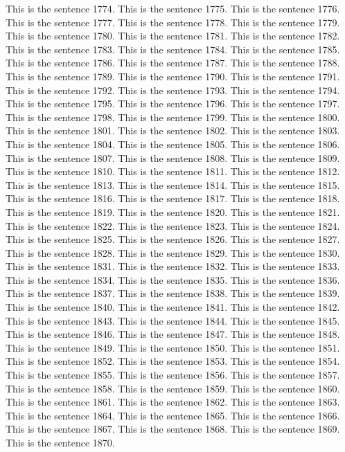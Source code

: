 \documentclass{article}
\begin{document}
This is the sentence 1774.
This is the sentence 1775.
This is the sentence 1776.
This is the sentence 1777.
This is the sentence 1778.
This is the sentence 1779.
This is the sentence 1780.
This is the sentence 1781.
This is the sentence 1782.
This is the sentence 1783.
This is the sentence 1784.
This is the sentence 1785.
This is the sentence 1786.
This is the sentence 1787.
This is the sentence 1788.
This is the sentence 1789.
This is the sentence 1790.
This is the sentence 1791.
This is the sentence 1792.
This is the sentence 1793.
This is the sentence 1794.
This is the sentence 1795.
This is the sentence 1796.
This is the sentence 1797.
This is the sentence 1798.
This is the sentence 1799.
This is the sentence 1800.
This is the sentence 1801.
This is the sentence 1802.
This is the sentence 1803.
This is the sentence 1804.
This is the sentence 1805.
This is the sentence 1806.
This is the sentence 1807.
This is the sentence 1808.
This is the sentence 1809.
This is the sentence 1810.
This is the sentence 1811.
This is the sentence 1812.
This is the sentence 1813.
This is the sentence 1814.
This is the sentence 1815.
This is the sentence 1816.
This is the sentence 1817.
This is the sentence 1818.
This is the sentence 1819.
This is the sentence 1820.
This is the sentence 1821.
This is the sentence 1822.
This is the sentence 1823.
This is the sentence 1824.
This is the sentence 1825.
This is the sentence 1826.
This is the sentence 1827.
This is the sentence 1828.
This is the sentence 1829.
This is the sentence 1830.
This is the sentence 1831.
This is the sentence 1832.
This is the sentence 1833.
This is the sentence 1834.
This is the sentence 1835.
This is the sentence 1836.
This is the sentence 1837.
This is the sentence 1838.
This is the sentence 1839.
This is the sentence 1840.
This is the sentence 1841.
This is the sentence 1842.
This is the sentence 1843.
This is the sentence 1844.
This is the sentence 1845.
This is the sentence 1846.
This is the sentence 1847.
This is the sentence 1848.
This is the sentence 1849.
This is the sentence 1850.
This is the sentence 1851.
This is the sentence 1852.
This is the sentence 1853.
This is the sentence 1854.
This is the sentence 1855.
This is the sentence 1856.
This is the sentence 1857.
This is the sentence 1858.
This is the sentence 1859.
This is the sentence 1860.
This is the sentence 1861.
This is the sentence 1862.
This is the sentence 1863.
This is the sentence 1864.
This is the sentence 1865.
This is the sentence 1866.
This is the sentence 1867.
This is the sentence 1868.
This is the sentence 1869.
This is the sentence 1870.
\end{document}
